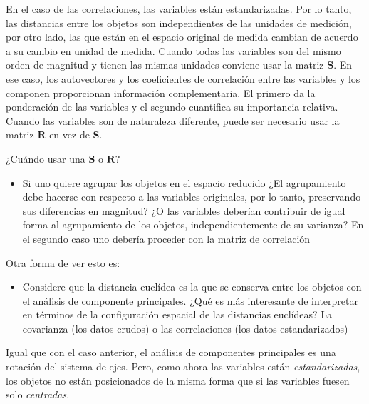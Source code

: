 \documentclass[]{book}
\providecommand{\tightlist}{%
  \setlength{\itemsep}{0pt}\setlength{\parskip}{0pt}}
\theoremstyle{definition}
\theoremstyle{definition}
\theoremstyle{definition}
\theoremstyle{remark}
\begin{document}
En el caso de las correlaciones, las variables están estandarizadas. Por
lo tanto, las distancias entre los objetos son independientes de las
unidades de medición, por otro lado, las que están en el espacio
original de medida cambian de acuerdo a su cambio en unidad de medida.
Cuando todas las variables son del mismo orden de magnitud y tienen las
mismas unidades conviene usar la matriz \(\mathbf{S}\). En ese caso, los
autovectores y los coeficientes de correlación entre las variables y los
componen proporcionan información complementaria. El primero da la
ponderación de las variables y el segundo cuantifica su importancia
relativa. Cuando las variables son de naturaleza diferente, puede ser
necesario usar la matriz \(\mathbf{R}\) en vez de \(\mathbf{S}\).

¿Cuándo usar una \(\mathbf{S}\) o \(\mathbf{R}\)?

\begin{itemize}
\tightlist
\item
  Si uno quiere agrupar los objetos en el espacio reducido ¿El
  agrupamiento debe hacerse con respecto a las variables originales, por
  lo tanto, preservando sus diferencias en magnitud? ¿O las variables
  deberían contribuir de igual forma al agrupamiento de los objetos,
  independientemente de su varianza? En el segundo caso uno debería
  proceder con la matriz de correlación
\end{itemize}

Otra forma de ver esto es:

\begin{itemize}
\tightlist
\item
  Considere que la distancia euclídea es la que se conserva entre los
  objetos con el análisis de componente principales. ¿Qué es más
  interesante de interpretar en términos de la configuración espacial de
  las distancias euclídeas? La covarianza (los datos crudos) o las
  correlaciones (los datos estandarizados)
\end{itemize}

Igual que con el caso anterior, el análisis de componentes principales
es una rotación del sistema de ejes. Pero, como ahora las variables
están \emph{estandarizadas}, los objetos no están posicionados de la
misma forma que si las variables fuesen solo \emph{centradas}.
\end{document}
